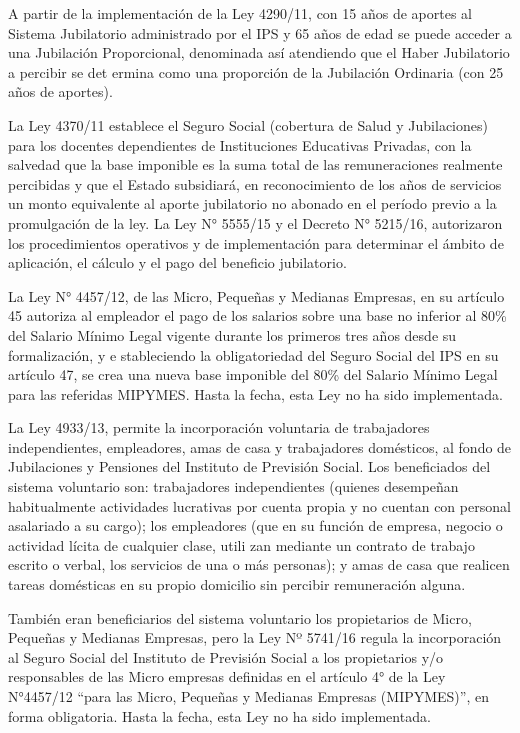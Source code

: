 A partir de la implementación de la Ley 4290/11, con 15 años de aportes
al Sistema Jubilatorio administrado por el IPS y 65 años de edad se
puede acceder a una Jubilación Proporcional, denominada así atendiendo
que el Haber Jubilatorio a percibir se det ermina como una proporción de
la Jubilación Ordinaria (con 25 años de aportes).

La Ley 4370/11 establece el Seguro Social (cobertura de Salud y
Jubilaciones) para los docentes dependientes de Instituciones Educativas
Privadas, con la salvedad que la base imponible es la suma total de las
remuneraciones realmente percibidas y que el Estado subsidiará, en
reconocimiento de los años de servicios un monto equivalente al aporte
jubilatorio no abonado en el período previo a la promulgación de la ley.
La Ley N° 5555/15 y el Decreto N° 5215/16, autorizaron los
procedimientos operativos y de implementación para determinar el ámbito
de aplicación, el cálculo y el pago del beneficio jubilatorio.

La Ley N° 4457/12, de las Micro, Pequeñas y Medianas Empresas, en su
artículo 45 autoriza al empleador el pago de los salarios sobre una base
no inferior al 80\% del Salario Mínimo Legal vigente durante los
primeros tres años desde su formalización, y e stableciendo la
obligatoriedad del Seguro Social del IPS en su artículo 47, se crea una
nueva base imponible del 80\% del Salario Mínimo Legal para las
referidas MIPYMES. Hasta la fecha, esta Ley no ha sido implementada.

La Ley 4933/13, permite la incorporación voluntaria de trabajadores
independientes, empleadores, amas de casa y trabajadores domésticos, al
fondo de Jubilaciones y Pensiones del Instituto de Previsión Social. Los
beneficiados del sistema voluntario son: trabajadores independientes
(quienes desempeñan habitualmente actividades lucrativas por cuenta
propia y no cuentan con personal asalariado a su cargo); los empleadores
(que en su función de empresa, negocio o actividad lícita de cualquier
clase, utili zan mediante un contrato de trabajo escrito o verbal, los
servicios de una o más personas); y amas de casa que realicen tareas
domésticas en su propio domicilio sin percibir remuneración alguna.

También eran beneficiarios del sistema voluntario los propietarios de
Micro, Pequeñas y Medianas Empresas, pero la Ley Nº 5741/16 regula la
incorporación al Seguro Social del Instituto de Previsión Social a los
propietarios y/o responsables de las Micro empresas definidas en el
artículo 4° de la Ley N°4457/12 ``para las Micro, Pequeñas y Medianas
Empresas (MIPYMES)'', en forma obligatoria. Hasta la fecha, esta Ley no
ha sido implementada.

